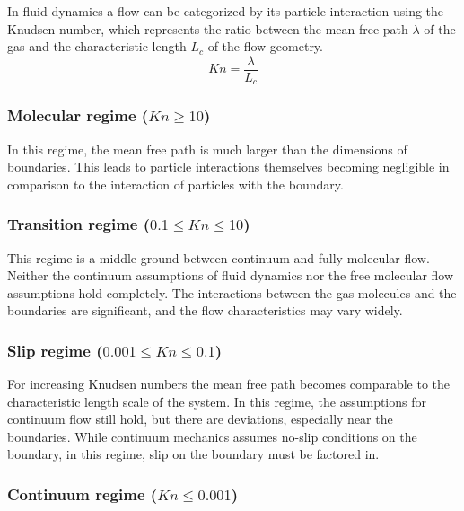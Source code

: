 	In fluid dynamics a flow can be categorized by its particle interaction using the Knudsen number, which represents the ratio between the mean-free-path $\lambda$ of the gas and the characteristic length $L_c$ of the flow geometry.
	\begin{equation}
		Kn=\frac{\lambda}{L_c}
	\end{equation}

\subsubsection*{Molecular regime (\(Kn \geq 10\))}

	In this regime, the mean free path is much larger than the dimensions of boundaries.
	This leads to particle interactions themselves becoming negligible in comparison to the interaction of particles with the boundary.

	

\subsubsection*{Transition regime (\(0.1 \leq Kn \leq 10\))}
	
	This regime is a middle ground between continuum and fully molecular flow.
	Neither the continuum assumptions of fluid dynamics nor the free molecular flow assumptions hold completely.
	The interactions between the gas molecules and the boundaries are significant, and the flow characteristics may vary widely.

\subsubsection*{Slip regime (\(0.001 \leq Kn \leq 0.1\))}

	For increasing Knudsen numbers the mean free path becomes comparable to the characteristic length scale of the system.
	In this regime, the assumptions for continuum flow still hold, but there are deviations, especially near the boundaries.
	While continuum mechanics assumes no-slip conditions on the boundary, in this regime, slip on the boundary must be factored in.

	

\subsubsection*{Continuum regime (\(Kn \leq 0.001\))}
	
